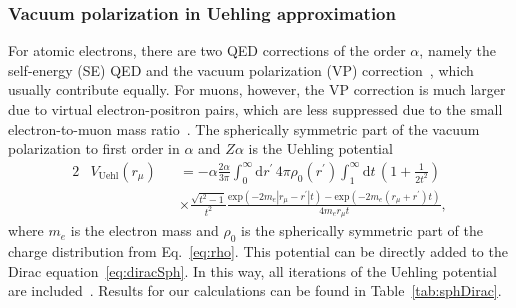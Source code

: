 \subsubsection{Vacuum polarization in Uehling approximation}
\label{sec:qed}

For atomic electrons, there are two QED corrections of the order $\alpha$, namely the self-energy (SE) QED and the vacuum polarization (VP) correction~\cite{Beier2000}, which usually contribute equally. For muons, however, the VP correction is much larger due to virtual electron-positron pairs, which are less suppressed due to the small electron-to-muon mass ratio~\cite{BorieRinker1982}. The spherically symmetric part of the vacuum polarization to first order in $\alpha$ and $Z\alpha$ is the Uehling potential~\cite{Elizarov2005}
\begin{alignat}{2}
&V_{\text{Uehl}}(r_\mu)&&=-\alpha \frac{2\alpha}{3\pi}\int_0^\infty \text{d}r^{\prime}\,4\pi \rho_0(r^\prime)\int_1^\infty \text{d}t\,\left( 1+\frac{1}{2t^2} \right)\nonumber\\[7.5pt]
&&&\times\frac{\sqrt{t^2-1}}{t^2} \frac{\text{exp}(-2m_e|r_\mu-r^\prime|t)-\text{exp}(-2m_e(r_\mu+r^\prime)t)}{4m_er_\mu t},
\label{eq:uehl_2}
\end{alignat}
where $m_e$ is the electron mass and $\rho_0$ is the spherically symmetric part of the charge distribution from Eq.~\eqref{eq:rho}. This potential can be directly added to the Dirac equation~\eqref{eq:diracSph}. In this way, all iterations of the Uehling potential are included~\cite{indelicato2013}. Results for our calculations can be found in Table~\ref{tab:sphDirac}.
%
%
